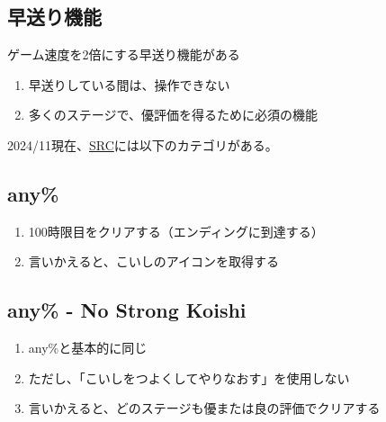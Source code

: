 \subsection{早送り機能}
ゲーム速度を2倍にする早送り機能がある
\begin{enumerate}[label={\sarrow}]
\item 早送りしている間は、操作できない
\item 多くのステージで、優評価を得るために必須の機能
\end{enumerate}







2024/11現在、\href{https://www.speedrun.com/komeiji_satori_no_jousou_kyouiku}{SRC}には以下のカテゴリがある。


\subsection{any\%}
\begin{enumerate}[label={\sarrow}]
\item 100時限目をクリアする（エンディングに到達する）
\item 言いかえると、こいしのアイコンを取得する
\end{enumerate}


\subsection{any\% - No Strong Koishi}
\begin{enumerate}[label={\sarrow}]
\item any\%と基本的に同じ
\item ただし、「こいしをつよくしてやりなおす」を使用しない
\item 言いかえると、どのステージも優または良の評価でクリアする
\end{enumerate}


